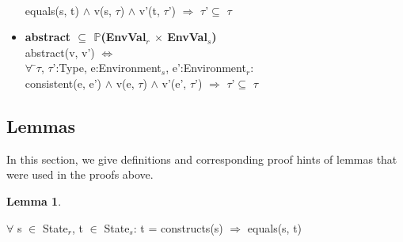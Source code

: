 \documentclass[conference]{IEEEtran}
\newtheorem{lem}{Lemma}
\begin{document}
\begin{itemize}
\begin{tabbing}
\\\>equals(s, t) $\wedge$ \textlbrackdbl v\textrbrackdbl(s, $\tau$) $\wedge$ \textlbrackdbl v'\textrbrackdbl(t, $\tau$') $\Rightarrow$ \textlbrackdbl $\tau$'\textrbrackdbl $\subseteq$ \textlbrackdbl $\tau$\textrbrackdbl
\end{tabbing}
\item \begin{tabbing}\textbf{abstract $\subseteq$ $\mathbb{P}$(EnvVal$_r$ $\times$ EnvVal$_s$)}
\\abstract(v, v') $\Leftrightarrow$
\\$\forall$ \=$\tau$, $\tau$':Type, e:Environment$_s$, e':Environment$_r$: 
\\\>consistent(e, e') $\wedge$ \textlbrackdbl v\textrbrackdbl(e, $\tau$) $\wedge$ \textlbrackdbl v'\textrbrackdbl(e', $\tau$') $\Rightarrow$ \textlbrackdbl $\tau$'\textrbrackdbl $\subseteq$ \textlbrackdbl $\tau$\textrbrackdbl
\end{tabbing}
\end{itemize}

\subsection{Lemmas}\label{subsec:lemmas}
In this section, we give definitions and corresponding proof hints of lemmas that were used in the proofs above.

\begin{lem} \end{lem}
\begin{tabbing}$\forall$ s $\in$ State$_r$, t $\in$ State$_s$: t = constructs(s) $\Rightarrow$ equals(s, t) \end{tabbing} 
\end{document}

